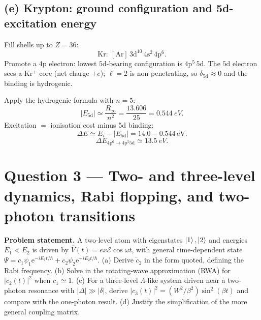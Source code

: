 \documentclass[11pt]{article}
\begin{document}
\subsection*{(e) Krypton: ground configuration and 5d-excitation energy}

Fill shells up to $Z=36$:
\begin{equation}
\boxed{\;\mathrm{Kr}:\ [\mathrm{Ar}]\,3\mathrm{d}^{10}\,4\mathrm{s}^{2}\,4\mathrm{p}^{6}.\;}
\end{equation}
Promote a $4\mathrm{p}$ electron: lowest $5\mathrm{d}$-bearing configuration is $4\mathrm{p}^{5}\,5\mathrm{d}$. The $5\mathrm{d}$ electron sees a Kr$^{+}$ core (net charge $+e$); $\ell=2$ is non-penetrating, so $\delta_{5\mathrm{d}}\approx 0$ and the binding is hydrogenic.

Apply the hydrogenic formula with $n=5$:
\begin{equation}
|E_{5\mathrm{d}}|\simeq \frac{R_{\infty}}{n^{2}}=\frac{13.606}{25}=\SI{0.544}{eV}.
\label{eq:E5d-Kr}
\end{equation}
Excitation $=$ ionisation cost minus 5d binding:
\begin{equation}
\Delta E\simeq E_{i}-|E_{5\mathrm{d}}|=14.0-0.544\,\mathrm{eV}.
\end{equation}
\begin{equation}
\boxed{\;\Delta E_{4\mathrm{p}^{6}\to 4\mathrm{p}^{5}5\mathrm{d}}\simeq \SI{13.5}{eV}.\;}
\label{eq:Kr-excitation}
\end{equation}

\section*{Question 3 --- Two- and three-level dynamics, Rabi flopping, and two-photon transitions}

\textbf{Problem statement.} A two-level atom with eigenstates $\ket{1},\ket{2}$ and energies $E_{1}<E_{2}$ is driven by $\hat V(t)=ex\mathcal{E}\cos\omega t$, with general time-dependent state $\Psi=c_{1}\psi_{1}\mathrm{e}^{-iE_{1}t/\hbar}+c_{2}\psi_{2}\mathrm{e}^{-iE_{2}t/\hbar}$. (a) Derive $\dot c_{2}$ in the form quoted, defining the Rabi frequency. (b) Solve in the rotating-wave approximation (RWA) for $|c_{2}(t)|^{2}$ when $c_{1}\simeq 1$. (c) For a three-level $\Lambda$-like system driven near a two-photon resonance with $|\Delta|\gg|\delta|$, derive $|c_{3}(t)|^{2}=(W^{2}/\beta^{2})\sin^{2}(\beta t)$ and compare with the one-photon result. (d) Justify the simplification of the more general coupling matrix.
\end{document}
